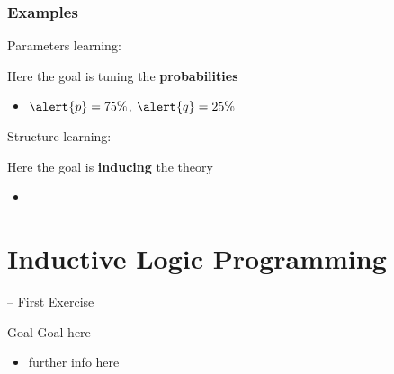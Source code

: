 \documentclass[presentation]{beamer}\mode<presentation>{\usetheme{AMSBolognaFC}}
\begin{document}
\begin{frame}[allowframebreaks]
    \frametitle{Examples}

    Parameters learning:

    \begin{exampleblock}{Here the goal is tuning the \textbf{probabilities}}
        \begin{itemize}
            \item $\alert{p} = 75\%$, \qquad $\alert{q} = 25\%$
        \end{itemize}
    \end{exampleblock}

    \framebreak

    Structure learning:
    \begin{exampleblock}{Here the goal is \textbf{inducing} the theory}
        \begin{itemize}
            \item {}
        \end{itemize}
    \end{exampleblock}
\end{frame}

\section{Inductive Logic Programming}

\startExercise

\begin{frame}{\currentExercise{} -- First Exercise}
    \begin{block}{Goal}
        Goal here
    \end{block}
    \begin{itemize}
        \item further info here
    \end{itemize}
\end{frame}

\section*{}
\end{document}
